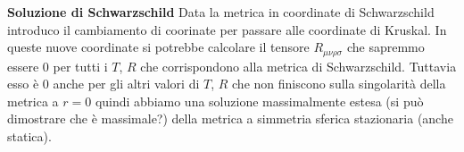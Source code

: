\documentclass[10pt,a4paper]{article}
\begin{document}
\textbf{Soluzione di Schwarzschild}
Data la metrica in coordinate di Schwarzschild introduco il cambiamento di coorinate per passare alle coordinate di Kruskal. In queste nuove coordinate si potrebbe calcolare il tensore $R_{\mu \nu \rho \sigma}$ che sapremmo essere 0 per tutti i $T$, $R$ che corrispondono alla metrica di Schwarzschild. Tuttavia esso è 0 anche per gli altri valori di $T$, $R$ che non finiscono sulla singolarità della metrica a $r=0$ quindi abbiamo una soluzione massimalmente estesa (si può dimostrare che è massimale?) della metrica a simmetria sferica stazionaria (anche statica).
\end{document}

